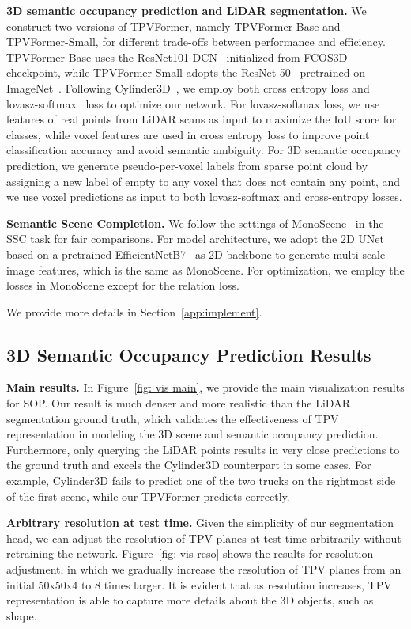 \documentclass[10pt,twocolumn,letterpaper]{article}
\begin{document}
\textbf{3D semantic occupancy prediction and LiDAR segmentation.}
We construct two versions of TPVFormer, namely TPVFormer-Base and TPVFormer-Small, for different trade-offs between performance and efficiency.
TPVFormer-Base uses the ResNet101-DCN~\cite{resnet,dcn} initialized from FCOS3D~\cite{fcos3d} checkpoint, while TPVFormer-Small adopts the ResNet-50~\cite{resnet} pretrained on ImageNet~\cite{deng2009imagenet}.
Following Cylinder3D~\cite{cylinder3D}, we employ both cross entropy loss and lovasz-softmax~\cite{lovasz} loss to optimize our network.
For lovasz-softmax loss, we use features of real points from LiDAR scans as input to maximize the IoU score for classes, while voxel features are used in cross entropy loss to improve point classification accuracy and avoid semantic ambiguity.
For 3D semantic occupancy prediction, we generate pseudo-per-voxel labels from sparse point cloud by assigning a new label of empty to any voxel that does not contain any point, and we use voxel predictions as input to both lovasz-softmax and cross-entropy losses.


\textbf{Semantic Scene Completion.}
We follow the settings of MonoScene~\cite{monoscene} in the SSC task for fair comparisons.
For model architecture, we adopt the 2D UNet based on a pretrained EfficientNetB7~\cite{efficientnet} as 2D backbone to generate multi-scale image features, which is the same as MonoScene.
For optimization, we employ the losses in MonoScene except for the relation loss.


We provide more details in Section~\ref{app:implement}.


\subsection{3D Semantic Occupancy Prediction Results}

\textbf{Main results.}
In Figure~\ref{fig: vis main}, we provide the main visualization results for SOP.
Our result is much denser and more realistic than the LiDAR segmentation ground truth, which validates the effectiveness of TPV representation in modeling the 3D scene and semantic occupancy prediction.
Furthermore, only querying the LiDAR points results in very close predictions to the ground truth and excels the Cylinder3D counterpart in some cases.
For example, Cylinder3D fails to predict one of the two trucks on the rightmost side of the first scene, while our TPVFormer predicts correctly.

\textbf{Arbitrary resolution at test time.}
Given the simplicity of our segmentation head, we can adjust the resolution of TPV planes at test time arbitrarily without retraining the network.
Figure~\ref{fig: vis reso} shows the results for resolution adjustment, in which we gradually increase the resolution of TPV planes from an initial 50x50x4 to 8 times larger.
It is evident that as resolution increases, TPV representation is able to capture more details about the 3D objects, such as shape.
\end{document}
